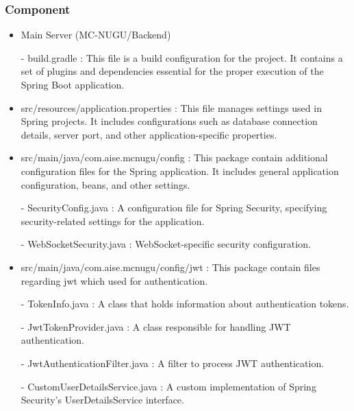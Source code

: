 \documentclass[conference]{IEEEtran}
\begin{document}
            
        \subsubsection{Component}
            \begin{itemize}
                \item Main Server (MC-NUGU/Backend)
                    \item[-]build.gradle : This file is a build configuration for the project. It contains a set of plugins and dependencies essential for the proper execution of the Spring Boot application.
                \vspace{3mm}
                
                \item src/resources/application.properties : This file manages settings used in Spring projects. It includes configurations such as database connection details, server port, and other application-specific properties.
                \vspace{3mm}
                
                \item src/main/java/com.aise.mcnugu/config : This package contain additional configuration files for the Spring application. It includes general application configuration, beans, and other settings.
                    \item[-] SecurityConfig.java : A configuration file for Spring Security, specifying security-related settings for the application.
                    \item[-] WebSocketSecurity.java : WebSocket-specific security configuration.
                \vspace{3mm}
                
                \item src/main/java/com.aise.mcnugu/config/jwt : This package contain files regarding jwt which used for authentication.
                    \item[-] TokenInfo.java : A class that holds information about authentication tokens.
                    \item[-] JwtTokenProvider.java : A class responsible for handling JWT authentication.
                    \item[-] JwtAuthenticationFilter.java : A filter to process JWT authentication.
                    \item[-] CustomUserDetailsService.java : A custom implementation of Spring Security’s UserDetailsService interface.
                \vspace{3mm}
                

\end{itemize}
\end{document}
